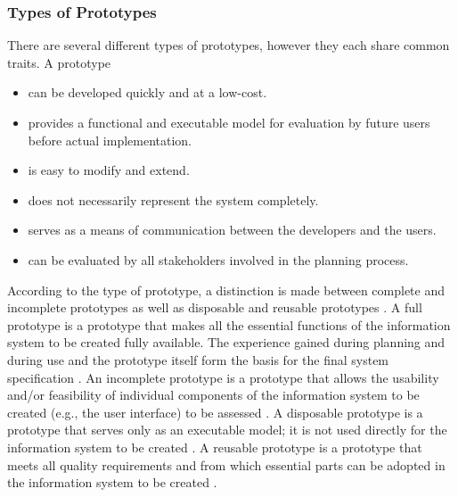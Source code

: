 \subsubsection*{Types of Prototypes}

There are several different types of prototypes,
however they each share common traits.
A prototype
\autocite{riedlManagementInformatik2019}

\begin{itemize}
	\item can be developed quickly and at a low-cost.
	\item provides a functional and executable model for evaluation by future users before actual implementation.
	\item is easy to modify and extend.
	\item does not necessarily represent the system completely.
	\item serves as a means of communication between the developers and the users.
	\item can be evaluated by all stakeholders involved in the planning process.
\end{itemize}

According to the type of prototype, a distinction is made between complete and incomplete prototypes
as well as disposable and reusable prototypes
\autocite{riedlManagementInformatik2019}.
A full prototype is a prototype that makes all the essential functions of the information system to be created fully available.
The experience gained during planning and during use and the prototype itself form the basis for the final system specification
\autocite{riedlManagementInformatik2019}.
An incomplete prototype is a prototype that allows the usability and/or feasibility of individual components
of the information system to be created (e.g., the user interface) to be assessed
\autocite{riedlManagementInformatik2019}.
A disposable prototype is a prototype that serves only as an executable model;
it is not used directly for the information system to be created
\autocite{riedlManagementInformatik2019}.
A reusable prototype is a prototype that meets all quality requirements and from which
essential parts can be adopted in the information system to be created
\autocite{riedlManagementInformatik2019}.

%

